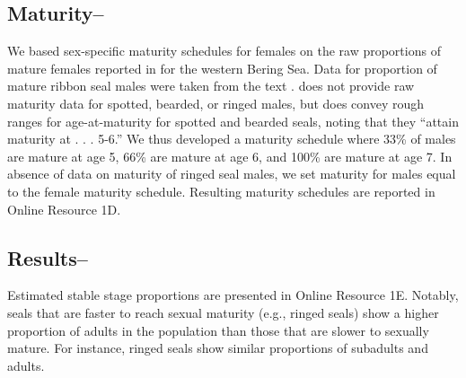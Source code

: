 \documentclass{svjour3}
\begin{document}
\subsection*{Maturity--}

We based sex-specific maturity schedules for females on the raw proportions of mature females reported in \citep[Tables 11, 24, 38, and 47 of][]{Fedoseev2000} for the western Bering Sea.  Data for proportion of mature ribbon seal males were taken from the text \citep[][, pg. 26]{Fedoseev2000}.  \citet{Fedoseev2000} does not provide raw maturity data for spotted, bearded, or ringed males, but does convey rough ranges for age-at-maturity for spotted and bearded seals, noting that they “attain maturity at . . . 5-6.” We thus developed a maturity schedule where 33\% of males are mature at age 5, 66\% are mature at age 6, and 100\% are mature at age 7.  In absence of data on maturity of ringed seal males, we set maturity for males equal to the female maturity schedule.  Resulting maturity schedules are reported in Online Resource 1D.

\subsection*{Results--}

Estimated stable stage proportions are presented in Online Resource 1E.  Notably, seals that are faster to reach sexual maturity (e.g., ringed seals) show a higher proportion of adults in the population than those that are slower to sexually mature.  For instance, ringed seals show similar proportions of subadults and adults.



\end{document}
